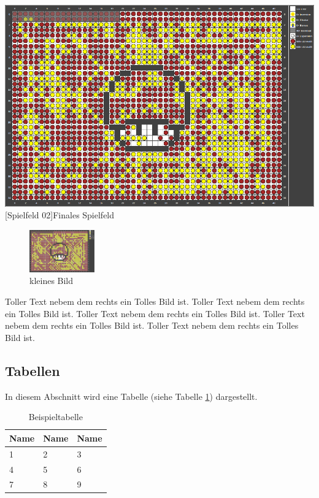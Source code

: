 \documentclass[12pt,a4paper,bibliography=totocnumbered,listof=totocnumbered]{scrartcl}
\begin{document}
    \vspace{1em}
    \begin{minipage}{\linewidth}
        \centering
        \includegraphics[width=0.6\linewidth]{pics/gamefield02.png}
        [Spielfeld 02]{Finales Spielfeld\footnotemark }
        \label{fig:reversi2}
    \end{minipage}
    
    \begin{figure}
    	\centering
    	\includegraphics[width=0.25\textwidth]{pics/gamefield02.png}
    	\caption{kleines Bild}
    	\label{fig:test11111111111111}
    \end{figure}
Toller Text nebem dem rechts ein Tolles Bild ist. Toller Text nebem dem rechts ein Tolles Bild ist. Toller Text nebem dem rechts ein Tolles Bild ist. Toller Text nebem dem rechts ein Tolles Bild ist. Toller Text nebem dem rechts ein Tolles Bild ist.
    \subsection{Tabellen}
    In diesem Abschnitt wird eine Tabelle (siehe Tabelle \ref{tab:beispiel}) dargestellt.

    \vspace{1em}
    \begin{table}[!h]
        \centering
        \begin{tabular}{|l|l|l|}
            \hline
            \textbf{Name} & \textbf{Name} & \textbf{Name}\\
            \hline
            1 & 2 & 3\\
            \hline
            4 & 5 & 6\\
            \hline
            7 & 8 & 9\\
            \hline
        \end{tabular}
        \caption{Beispieltabelle}
        \label{tab:beispiel}
    \end{table}
\end{document}
